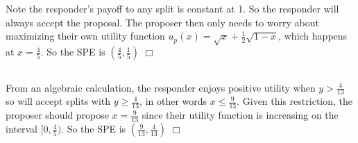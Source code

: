\documentclass{article}
\begin{document}
\section{}
\subsection{}
Note the responder's payoff to any split is constant at 1. So the responder will always accept the proposal. The proposer then only needs to worry about maximizing their own utility function $u_p(x) = \sqrt{x} + \frac{1}{2}\sqrt{1-x}$, which happens at $x = \frac{4}{5}$. So the SPE is $(\frac{4}{5}, \frac{1}{5})$ $\Box$

\subsection{}
From an algebraic calculation, the responder enjoys positive utility when $y > \frac{4}{13}$ so will accept splits with $y \geq \frac{4}{13}$, in other words $x \leq \frac{9}{13}$. Given this restriction, the proposer should propose $x = \frac{9}{13}$ since their utility function is increasing on the interval $[0,\frac{4}{5})$. So the SPE is $(\frac{9}{13}, \frac{4}{13})$ $\Box$
\end{document}
